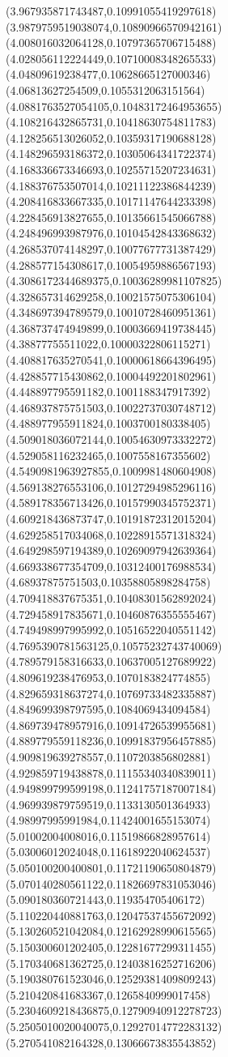 {(3.967935871743487,0.10991055419297618)
(3.9879759519038074,0.10890966570942161)
(4.008016032064128,0.10797365706715488)
(4.028056112224449,0.10710008348265533)
(4.04809619238477,0.10628665127000346)
(4.06813627254509,0.1055312063151564)
(4.0881763527054105,0.10483172464953655)
(4.108216432865731,0.10418630754811783)
(4.128256513026052,0.10359317190688128)
(4.148296593186372,0.10305064341722374)
(4.168336673346693,0.10255715207234631)
(4.188376753507014,0.10211122386844239)
(4.208416833667335,0.10171147644233398)
(4.228456913827655,0.10135661545066788)
(4.248496993987976,0.10104542843368632)
(4.268537074148297,0.10077677731387429)
(4.288577154308617,0.10054959886567193)
(4.3086172344689375,0.10036289981107825)
(4.328657314629258,0.10021575075306104)
(4.348697394789579,0.10010728460951361)
(4.368737474949899,0.10003669419738445)
(4.38877755511022,0.10000322806115271)
(4.408817635270541,0.10000618664396495)
(4.428857715430862,0.10004492201802961)
(4.448897795591182,0.1001188347917392)
(4.468937875751503,0.10022737030748712)
(4.488977955911824,0.1003700180338405)
(4.509018036072144,0.10054630973332272)
(4.529058116232465,0.1007558167355602)
(4.5490981963927855,0.1009981480604908)
(4.569138276553106,0.10127294985296116)
(4.589178356713426,0.10157990345752371)
(4.609218436873747,0.10191872312015204)
(4.629258517034068,0.10228915571318324)
(4.649298597194389,0.10269097942639364)
(4.669338677354709,0.10312400176988534)
(4.68937875751503,0.10358805898284758)
(4.709418837675351,0.10408301562892024)
(4.729458917835671,0.10460876355555467)
(4.749498997995992,0.10516522040551142)
(4.7695390781563125,0.10575232743740069)
(4.789579158316633,0.10637005127689922)
(4.809619238476953,0.1070183824774855)
(4.829659318637274,0.10769733482335887)
(4.849699398797595,0.1084069434094584)
(4.869739478957916,0.10914726539955681)
(4.889779559118236,0.10991837956457885)
(4.909819639278557,0.1107203856802881)
(4.929859719438878,0.11155340340839011)
(4.949899799599198,0.11241757187007184)
(4.969939879759519,0.1133130501364933)
(4.98997995991984,0.11424001655153074)
(5.01002004008016,0.11519866828957614)
(5.03006012024048,0.11618922040624537)
(5.050100200400801,0.11721190650804879)
(5.070140280561122,0.11826697831053046)
(5.090180360721443,0.119354705406172)
(5.110220440881763,0.12047537455672092)
(5.130260521042084,0.12162928990615565)
(5.150300601202405,0.12281677299311455)
(5.170340681362725,0.12403816252716206)
(5.190380761523046,0.12529381409809243)
(5.210420841683367,0.1265840999017458)
(5.2304609218436875,0.12790940912278723)
(5.2505010020040075,0.12927014772283132)
(5.270541082164328,0.13066673835543852)
}
